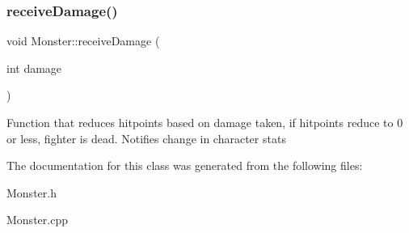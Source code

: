 \subsubsection{\texorpdfstring{receive\+Damage()}{receiveDamage()}}
{\footnotesize\ttfamily void Monster\+::receive\+Damage (\begin{DoxyParamCaption}\item[{int}]{damage }\end{DoxyParamCaption})}

Function that reduces hitpoints based on damage taken, if hitpoints reduce to 0 or less, fighter is dead. Notifies change in character stats 

The documentation for this class was generated from the following files\+:\begin{DoxyCompactItemize}
\item 
Monster.\+h\item 
Monster.\+cpp\end{DoxyCompactItemize}
